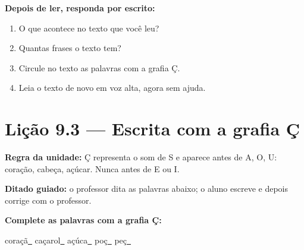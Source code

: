 \textbf{Depois de ler, responda por escrito:}
\begin{enumerate}

  \item O que acontece no texto que você leu?
  \begin{center}
  \underline{\hspace{12cm}}
  \end{center}

  \item Quantas frases o texto tem?
  \begin{center}
  \underline{\hspace{12cm}}
  \end{center}

  \item Circule no texto as palavras com a grafia Ç.

  \item Leia o texto de novo em voz alta, agora sem ajuda.

\end{enumerate}

\section{Lição 9.3 --- Escrita com a grafia Ç}

\noindent\textbf{Regra da unidade:} Ç representa o som de S e aparece antes de A, O, U: coração, cabeça, açúcar. Nunca antes de E ou I.


\noindent\textbf{Ditado guiado:} o professor dita as palavras abaixo; o aluno escreve e depois corrige com o professor.

\begin{center}
  \underline{\hspace{2.3cm}} \quad \underline{\hspace{2.3cm}} \quad \underline{\hspace{2.3cm}} \quad \underline{\hspace{2.3cm}}

  \underline{\hspace{2.3cm}} \quad \underline{\hspace{2.3cm}} \quad \underline{\hspace{2.3cm}} \quad \underline{\hspace{2.3cm}}
\end{center}

\noindent\textbf{Complete as palavras com a grafia Ç:}
\begin{center}
  coraçã\underline{~} \quad caçarol\underline{~} \quad açúca\underline{~} \quad poç\underline{~} \quad peç\underline{~}
\end{center}


